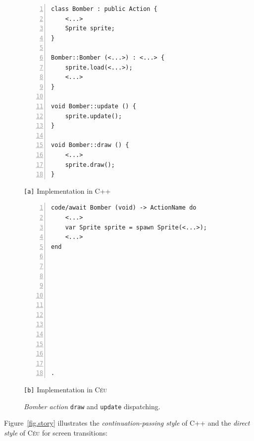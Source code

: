 \documentclass{vgtc}                          %
\newcommand{\CEU}{\textsc{C\'{e}u}\xspace}
\newcommand{\code}[1] {{\small{\texttt{#1}}}}
\newcommand{\ax}{\code{[a]}\xspace}
\newcommand{\bx}{\code{[b]}\xspace}
\begin{document}
\begin{figure}[t]
\begin{minipage}[t]{0.50\linewidth}
\begin{lstlisting}[numbers=left,xleftmargin=3em]
class Bomber : public Action {
    <...>
    Sprite sprite;
}

Bomber::Bomber (<...>) : <...> {
    sprite.load(<...>);
    <...>
}

void Bomber::update () {
    sprite.update();
}

void Bomber::draw () {
    <...>
    sprite.draw();
}
\end{lstlisting}
\centering\small{\ax Implementation in C++}
\end{minipage}
%
\begin{minipage}[t]{0.50\linewidth}
\begin{lstlisting}[numbers=left,xleftmargin=3em]
code/await Bomber (void) -> ActionName do
    <...>
    var Sprite sprite = spawn Sprite(<...>);
    <...>
end












.
\end{lstlisting}
\centering\small{\bx Implementation in \CEU}
\end{minipage}
\caption{ \emph{Bomber action} \code{draw} and \code{update} dispatching.
\label{lst.hier}
}
\end{figure}

Figure~\ref{fig.story} illustrates the \emph{continuation-passing style} of
C++ and the \emph{direct style} of \CEU for screen transitions:
\end{document}
